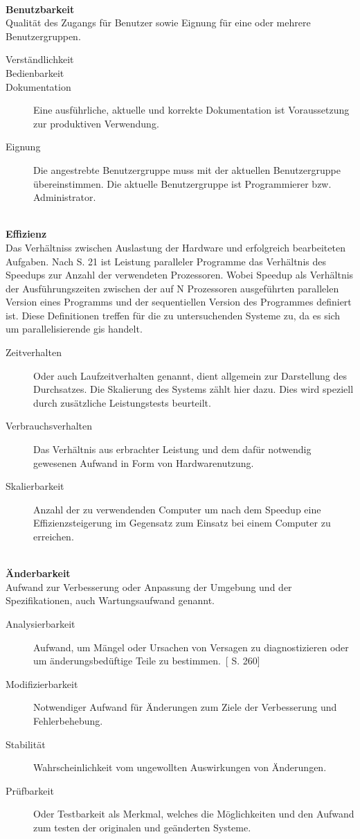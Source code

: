 \ \\
%
\textbf{Benutzbarkeit}\\
Qualität des Zugangs für Benutzer sowie Eignung für eine oder mehrere Benutzergruppen.
\begin{description}
\item[Verständlichkeit] 
\item[Bedienbarkeit] 
\item[Dokumentation] Eine ausführliche, aktuelle und korrekte Dokumentation ist Voraussetzung zur produktiven Verwendung.
\item[Eignung] Die angestrebte Benutzergruppe muss mit der aktuellen Benutzergruppe übereinstimmen. Die aktuelle Benutzergruppe ist Programmierer bzw. Administrator.
\end{description}
\ \\
%
\textbf{Effizienz}\\
Das Verhältniss zwischen Auslastung der Hardware und erfolgreich bearbeiteten Aufgaben. Nach \cite{book:Leistungsanalyse} S. 21 ist Leistung paralleler Programme das Verhältnis des Speedups zur Anzahl der verwendeten Prozessoren. Wobei Speedup als Verhältnis der Ausführungszeiten zwischen der auf N Prozessoren ausgeführten parallelen Version eines Programms und der sequentiellen Version des Programmes definiert ist. Diese Definitionen treffen für die zu untersuchenden Systeme zu, da es sich um parallelisierende \Gls{gis} handelt.
\begin{description}
\item[Zeitverhalten] Oder auch Laufzeitverhalten genannt, dient allgemein zur Darstellung des Durchsatzes. Die Skalierung des Systems zählt hier dazu. Dies wird speziell durch zusätzliche Leistungstests beurteilt.
\item[Verbrauchsverhalten] Das Verhältnis aus erbrachter Leistung und dem dafür notwendig gewesenen Aufwand in Form von Hardwarenutzung.
\item[Skalierbarkeit] Anzahl der zu verwendenden Computer um nach dem Speedup eine Effizienzsteigerung im Gegensatz zum Einsatz bei einem Computer zu erreichen.
\end{description}
\ \\
%
\textbf{Änderbarkeit}\\
Aufwand zur Verbesserung oder Anpassung der Umgebung und der Spezifikationen, auch Wartungsaufwand genannt.
\begin{description}
\item[Analysierbarkeit] \glqq Aufwand, um Mängel oder Ursachen von Versagen zu diagnostizieren oder um änderungsbedüftige Teile zu bestimmen.\grqq\ [\cite{book:lehrbuchsoftware} S. 260]
\item[Modifizierbarkeit] Notwendiger Aufwand für Änderungen zum Ziele der Verbesserung und Fehlerbehebung.
\item[Stabilität] Wahrscheinlichkeit vom ungewollten Auswirkungen von Änderungen.
\item[Prüfbarkeit] Oder Testbarkeit als Merkmal, welches die Möglichkeiten und den Aufwand zum testen der originalen und geänderten Systeme.
\end{description}
